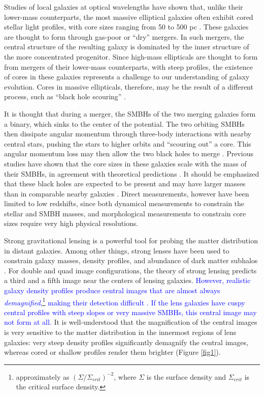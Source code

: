 \documentclass[chicago]{emulateapj}
\newcommand{\blue}{\textcolor{blue}}
\newcommand{\red}{\textcolor{red}}
\begin{document}
Studies of local galaxies at optical wavelengths have shown that, unlike their lower-mass counterparts, the most massive elliptical galaxies often exhibit cored stellar light profiles, with core sizes ranging from 50 to 500 pc \citep[e.g.,][]{Ferrarese:06}. 
These galaxies are thought to form through gas-poor or ``dry'' mergers. In such mergers, the central structure of the resulting galaxy is dominated by the inner structure of the more concentrated progenitor.  Since high-mass ellipticals are thought to form from mergers of their lower-mass counterparts, with steep profiles, the existence of cores in these galaxies represents a challenge to our understanding of galaxy evolution. Cores in massive ellipticals, therefore, may be the result of a different process, such as  
``black hole scouring'' \citep{Thomas:14}.

It is thought that during a merger, the SMBHs of the two merging galaxies form a binary, which sinks to the center of the potential. The two orbiting SMBHs then dissipate angular momentum through three-body interactions with nearby central stars, pushing the stars to higher orbits and ``scouring out'' a core. This angular momentum loss may then allow the two black holes to merge \citep{Begelman:80}.
Previous studies have shown that the core sizes in these galaxies scale with the mass of their SMBHs, in agreement with theoretical predictions \citep{Kormendy:09,Kormendy:13}. It should be emphasized that these black holes are expected to be present and may have larger masses than in comparable nearby galaxies \citep{Bennert:10}. Direct measurements, however have been limited to low redshifts, since both dynamical measurements to constrain the stellar and SMBH masses, and morphological measurements to constrain core sizes require very high physical resolutions. 


Strong gravitational lensing is a powerful tool for probing the 
matter distribution in distant galaxies. Among other things, strong 
lenses have been used to constrain galaxy masses, density profiles, 
and abundance of dark matter subhalos \citep[e.g.,][]{dalal:02, 
Gavazzi:07, Bolton:08}. For double and quad image configurations, 
the theory of strong lensing predicts a third and a fifth image 
near the centers of lensing galaxies.
\blue{However, realistic galaxy density profiles produce central 
images that are almost always 
\emph{demagnified},\footnote{approximately as 
$(\Sigma/\Sigma_{crit})^{-2}$, where $\Sigma$ is the surface 
density and $\Sigma_{crit}$ is the critical surface density.} 
making their detection difficult \citep[e.g.,][]{Jackson:13}. If 
the lens galaxies have cuspy central profiles with steep slopes or 
very massive SMBHs, this central image may not form at all.}
It is well-understood that the magnification of the central images 
is very sensitive to the matter distribution in the innermost 
regions of lens galaxies: very steep density profiles significantly 
demagnify the central images, whereas cored or shallow profiles 
render them brighter (Figure \ref{fig1}).
\end{document}
